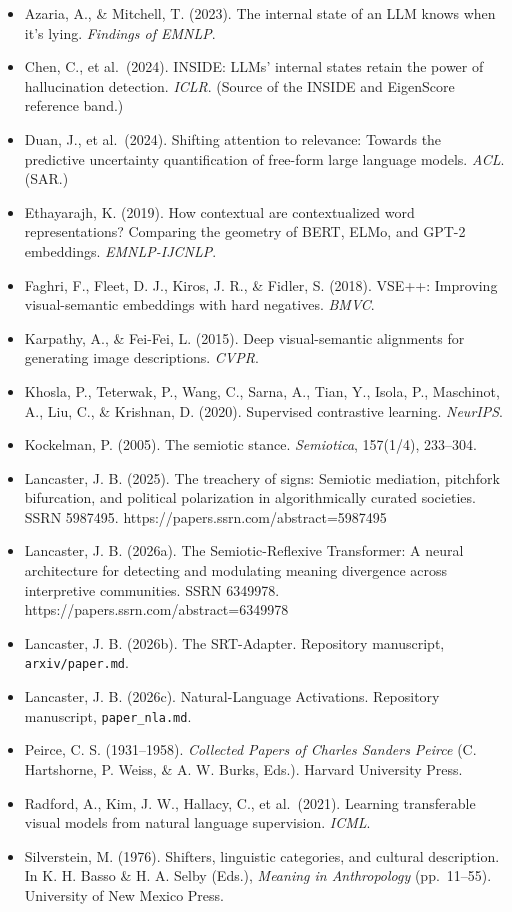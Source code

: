 \documentclass[
  11pt,
]{article}
\providecommand{\tightlist}{%
  \setlength{\itemsep}{0pt}\setlength{\parskip}{0pt}}
\begin{document}
\begin{itemize}
\tightlist
\item
  Azaria, A., \& Mitchell, T. (2023). The internal state of an LLM knows
  when it's lying. \emph{Findings of EMNLP}.
\item
  Chen, C., et al.~(2024). INSIDE: LLMs' internal states retain the
  power of hallucination detection. \emph{ICLR}. (Source of the INSIDE
  and EigenScore reference band.)
\item
  Duan, J., et al.~(2024). Shifting attention to relevance: Towards the
  predictive uncertainty quantification of free-form large language
  models. \emph{ACL}. (SAR.)
\item
  Ethayarajh, K. (2019). How contextual are contextualized word
  representations? Comparing the geometry of BERT, ELMo, and GPT-2
  embeddings. \emph{EMNLP-IJCNLP}.
\item
  Faghri, F., Fleet, D. J., Kiros, J. R., \& Fidler, S. (2018). VSE++:
  Improving visual-semantic embeddings with hard negatives. \emph{BMVC}.
\item
  Karpathy, A., \& Fei-Fei, L. (2015). Deep visual-semantic alignments
  for generating image descriptions. \emph{CVPR}.
\item
  Khosla, P., Teterwak, P., Wang, C., Sarna, A., Tian, Y., Isola, P.,
  Maschinot, A., Liu, C., \& Krishnan, D. (2020). Supervised contrastive
  learning. \emph{NeurIPS}.
\item
  Kockelman, P. (2005). The semiotic stance. \emph{Semiotica}, 157(1/4),
  233--304.
\item
  Lancaster, J. B. (2025). The treachery of signs: Semiotic mediation,
  pitchfork bifurcation, and political polarization in algorithmically
  curated societies. SSRN 5987495.
  https://papers.ssrn.com/abstract=5987495
\item
  Lancaster, J. B. (2026a). The Semiotic-Reflexive Transformer: A neural
  architecture for detecting and modulating meaning divergence across
  interpretive communities. SSRN 6349978.
  https://papers.ssrn.com/abstract=6349978
\item
  Lancaster, J. B. (2026b). The SRT-Adapter. Repository manuscript,
  \texttt{arxiv/paper.md}.
\item
  Lancaster, J. B. (2026c). Natural-Language Activations. Repository
  manuscript, \texttt{paper\_nla.md}.
\item
  Peirce, C. S. (1931--1958). \emph{Collected Papers of Charles Sanders
  Peirce} (C. Hartshorne, P. Weiss, \& A. W. Burks, Eds.). Harvard
  University Press.
\item
  Radford, A., Kim, J. W., Hallacy, C., et al.~(2021). Learning
  transferable visual models from natural language supervision.
  \emph{ICML}.
\item
  Silverstein, M. (1976). Shifters, linguistic categories, and cultural
  description. In K. H. Basso \& H. A. Selby (Eds.), \emph{Meaning in
  Anthropology} (pp.~11--55). University of New Mexico Press.
\end{itemize}
\end{document}
